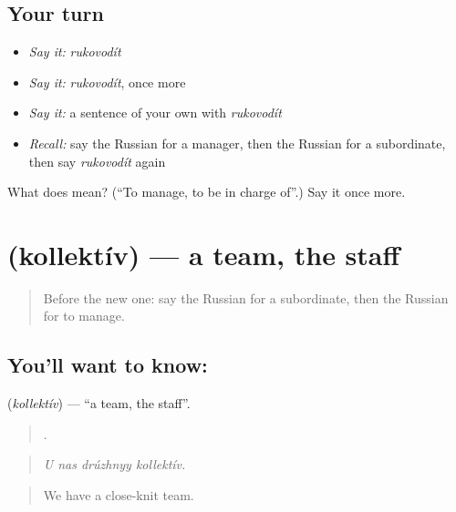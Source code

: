 \subsection*{Your turn}
\begin{itemize}
\raggedright
  \item \emph{Say it:} \emph{rukovodít}
  \item \emph{Say it:} \emph{rukovodít}, once more
  \item \emph{Say it:} a sentence of your own with \emph{rukovodít}
  \item \emph{Recall:} say the Russian for a manager, then the Russian for a subordinate, then say \emph{rukovodít} again
\end{itemize}

\begin{tcolorbox}[breakable,colback=teal!4,colframe=teal!35!black,title={Before you move on}]
What does  mean? (\textquotedblleft{}To manage, to be in charge of\textquotedblright{}.) Say it once more.
\end{tcolorbox}
\section[\texorpdfstring{\ru{коллектив} (kollektív)}{коллектив (kollektív)}]{ (kollektív) — a team, the staff}

\label{lesson:RU-C357-kollektiv}



\begin{quote}
Before the new one: say the Russian for a subordinate, then the Russian for to manage.
\end{quote}

\subsection*{You'll want to know: }
\textbf{} (\emph{kollektív}) — \textquotedblleft{}a team, the staff\textquotedblright{}.

\begin{quote}
   .
\end{quote}

\begin{quote}
\emph{U nas drúzhnyy kollektív.}
\end{quote}

\begin{quote}
We have a close-knit team.
\end{quote}

